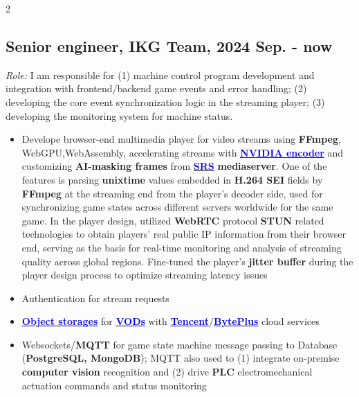 \documentclass[11pt]{article}
\begin{document}
\begin{multicols*}{2}
\subsection*{Senior engineer, IKG Team, 2024 Sep. - now}
{\footnotesize \textit{Role:} I am responsible for (1) machine control program development and integration with frontend/backend game events and error handling; (2) developing the core event synchronization logic in the streaming player; (3) developing the monitoring system for machine status.\par}
\vspace{0.4em}
\begin{itemize}[noitemsep]
    \item Develope browser-end multimedia player for video streams using \textbf{FFmpeg}, WebGPU,WebAssembly,
    accelerating streams with \href{https://developer.nvidia.com/video-codec-sdk}{\textbf{\textcolor{blue}{NVIDIA encoder}}}
    and customizing \textbf{AI-masking frames} from \href{https://github.com/ossrs/srs}{\textbf{\textcolor{blue}{SRS}}} \textbf{mediaserver}.
    One of the features is parsing \textbf{unixtime} values embedded in \textbf{H.264 SEI} fields by \textbf{FFmpeg} at the streaming end from the player's decoder side,
    used for synchronizing game states across different servers worldwide for the same game.
    In the player design, utilized \textbf{WebRTC} protocol \textbf{STUN} related technologies to obtain players' real public IP information from their browser end,
    serving as the basis for real-time monitoring and analysis of streaming quality across global regions.
    Fine-tuned the player's \textbf{jitter buffer} during the player design process to optimize streaming latency issues
    \item Authentication for stream requests
    \item \href{https://www.byteplus.com/en/product/tos}{\textbf{\textcolor{blue}{Object storages}}} for \href{https://www.byteplus.com/en/product/vod}{\textbf{\textcolor{blue}{VODs}}} with \href{https://www.tencent.com/en-us/cloud}{\textbf{\textcolor{blue}{Tencent}}}/\href{https://www.byteplus.com/en/product/vod}{\textbf{\textcolor{blue}{BytePlus}}} cloud services
    \item Websockets/\textbf{MQTT} for game state machine message passing to Database (\textbf{PostgreSQL, MongoDB}); MQTT also used to (1) integrate on-premise \textbf{computer vision} recognition and (2) drive \textbf{PLC} electromechanical actuation commands and status monitoring

\end{itemize}
\end{multicols*}
\end{document}
